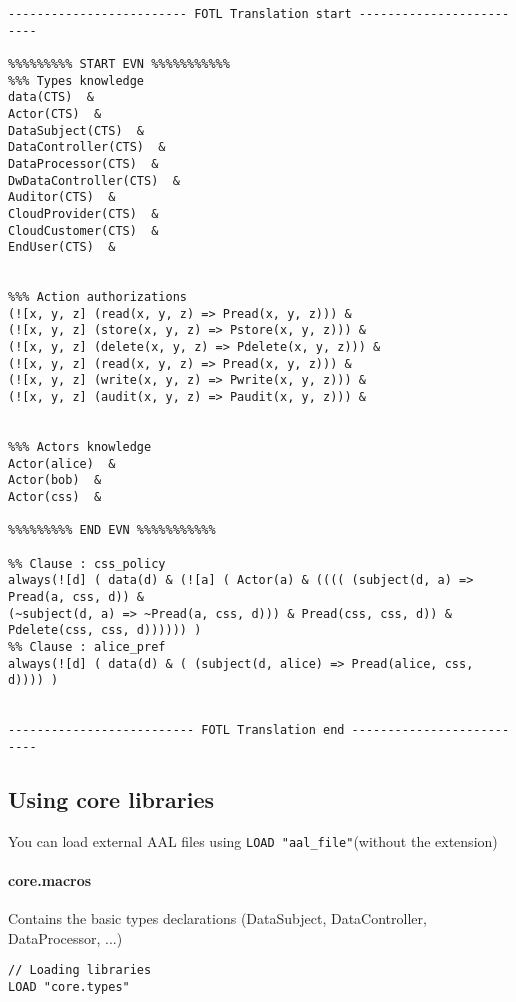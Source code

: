 \begin{itemize}
{\begin{lstlisting}
------------------------- FOTL Translation start -------------------------

%%%%%%%%% START EVN %%%%%%%%%%%
%%% Types knowledge
data(CTS)  &
Actor(CTS)  &
DataSubject(CTS)  &
DataController(CTS)  &
DataProcessor(CTS)  &
DwDataController(CTS)  &
Auditor(CTS)  &
CloudProvider(CTS)  &
CloudCustomer(CTS)  &
EndUser(CTS)  &


%%% Action authorizations
(![x, y, z] (read(x, y, z) => Pread(x, y, z))) &
(![x, y, z] (store(x, y, z) => Pstore(x, y, z))) &
(![x, y, z] (delete(x, y, z) => Pdelete(x, y, z))) &
(![x, y, z] (read(x, y, z) => Pread(x, y, z))) &
(![x, y, z] (write(x, y, z) => Pwrite(x, y, z))) &
(![x, y, z] (audit(x, y, z) => Paudit(x, y, z))) &


%%% Actors knowledge
Actor(alice)  &
Actor(bob)  &
Actor(css)  &

%%%%%%%%% END EVN %%%%%%%%%%%

%% Clause : css_policy
always(![d] ( data(d) & (![a] ( Actor(a) & (((( (subject(d, a) => Pread(a, css, d)) &
(~subject(d, a) => ~Pread(a, css, d))) & Pread(css, css, d)) & Pdelete(css, css, d)))))) )
%% Clause : alice_pref
always(![d] ( data(d) & ( (subject(d, alice) => Pread(alice, css, d)))) )


-------------------------- FOTL Translation end --------------------------
\end{lstlisting}
}
\end{itemize}





\subsection{Using core libraries}
You can load external AAL files using \texttt{LOAD "aal\_file"}(without the extension) 

\paragraph{core.macros} Contains the basic types declarations (DataSubject, DataController, DataProcessor, ...)
\begin{lstlisting}
// Loading libraries
LOAD "core.types"
\end{lstlisting}



